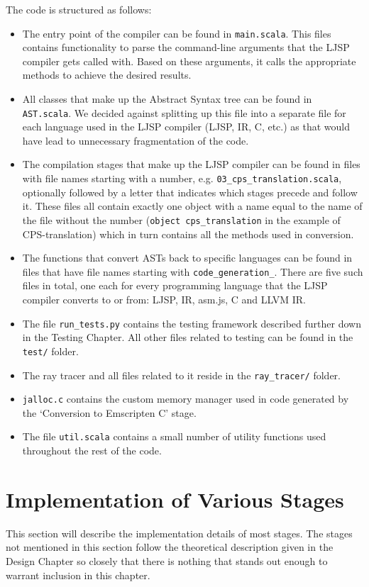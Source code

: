 \documentclass[11pt]{report}
\begin{document}
The code is structured as follows:
\begin{itemize}
\item The entry point of the compiler can be found in \texttt{main.scala}. This files contains functionality to parse the command-line arguments that the LJSP compiler gets called with. Based on these arguments, it calls the appropriate methods to achieve the desired results.
\item All classes that make up the Abstract Syntax tree can be found in \texttt{AST.scala}. We decided against splitting up this file into a separate file for each language used in the LJSP compiler (LJSP, IR, C, etc.) as that would have lead to unnecessary fragmentation of the code.
\item The compilation stages that make up the LJSP compiler can be found in files with file names starting with a number, e.g. \texttt{03_cps_translation.scala}, optionally followed by a letter that indicates which stages precede and follow it. These files all contain exactly one object with a name equal to the name of the file without the number (\texttt{object cps_translation} in the example of CPS-translation) which in turn contains all the methods used in conversion. 

\item The functions that convert ASTs back to specific languages can be found in files that have file names starting with \texttt{code_generation_}. There are five such files in total, one each for every programming language that the LJSP compiler converts to or from: LJSP, IR, asm.js, C and LLVM IR.
\item The file \texttt{run_tests.py} contains the testing framework described further down in the Testing Chapter. All other files related to testing can be found in the \texttt{test/} folder.
\item The ray tracer and all files related to it reside in the \texttt{ray_tracer/} folder.
\item \texttt{jalloc.c} contains the custom memory manager used in code generated by the `Conversion to Emscripten C' stage.
\item The file \texttt{util.scala} contains a small number of utility functions used throughout the rest of the code.
\end{itemize}

\section{Implementation of Various Stages}
This section will describe the implementation details of most stages. The stages not mentioned in this section follow the theoretical description given in the Design Chapter so closely that there is nothing that stands out enough to warrant inclusion in this chapter.
\end{document}
